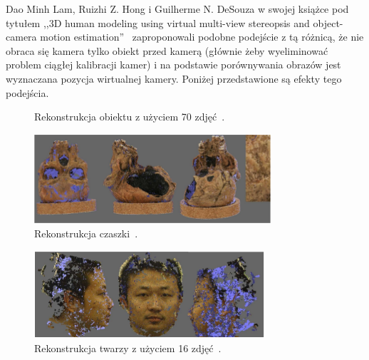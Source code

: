 Dao Minh Lam, Ruizhi Z. Hong i Guilherme N. DeSouza w swojej książce
pod tytułem ,,3D human modeling using virtual multi-view stereopsis and
object-camera motion estimation''~\cite{multiview02} zaproponowali podobne
podejście z tą różnicą, że nie obraca się kamera tylko obiekt przed
kamerą (głównie żeby wyeliminować problem ciągłej kalibracji kamer) i na
podstawie porównywania obrazów jest wyznaczana pozycja wirtualnej kamery.
Poniżej przedstawione są efekty tego podejścia.

\begin{figure}[h!]
  \centering
  \qquad
  \caption{Rekonstrukcja obiektu z użyciem 70 zdjęć~\cite{multiview02}.}
  \label{mv_02_01}
\end{figure}

\begin{figure}[h!]
  \centering
  \includegraphics{images/mv_02_03.png}
  \caption{Rekonstrukcja czaszki~\cite{multiview02}.}
  \label{mv_02_02}
\end{figure}

\begin{figure}[h!]
  \centering
  \includegraphics{images/mv_02_04.png}
  \caption{Rekonstrukcja twarzy z użyciem 16 zdjęć~\cite{multiview02}.}
  \label{mv_02_03}
\end{figure}

